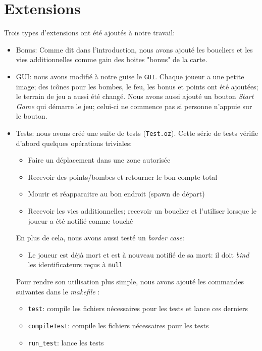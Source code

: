 \documentclass{article}
\begin{document}
\section{Extensions}
Trois types d'extensions ont été ajoutés à notre travail:
\begin{itemize}
	\item Bonus: Comme dit dans l'introduction, nous avons ajouté les boucliers et les vies additionnelles comme gain des boites "bonus" de la carte.
	\item GUI: nous avons modifié à notre guise le \texttt{GUI}. Chaque joueur a une petite image; des icônes pour les bombes, le feu, les bonus et points ont été ajoutées; le terrain de jeu a aussi été changé. Nous avons aussi ajouté un bouton \emph{Start Game} qui démarre le jeu; celui-ci ne commence pas si personne n'appuie sur le bouton. 
	\item Tests: nous avons créé une suite de tests (\texttt{Test.oz}). Cette série de tests vérifie d'abord quelques opérations triviales:
		\begin{itemize}
			\item Faire un déplacement dans une zone autorisée
			\item Recevoir des points/bombes et retourner le bon compte total
			\item Mourir et réapparaitre au bon endroit (spawn de départ)
			\item Recevoir les vies additionnelles; recevoir un bouclier et l'utiliser lorsque le joueur a été notifié comme touché
		\end{itemize}
	En plus de cela, nous avons aussi testé un \emph{border case}:
		\begin{itemize}
			\item Le joueur est déjà mort et est à nouveau notifié de sa mort: il doit \emph{bind} les identificateurs reçus à \texttt{null}
			
		\end{itemize}
	Pour rendre son utilisation plus simple, nous avons ajouté les commandes suivantes dans le \emph{makefile} :
	\begin{itemize}
		\item \texttt{test}: compile les fichiers nécessaires pour les tests et lance ces derniers
		\item \texttt{compileTest}: compile les fichiers nécessaires pour les tests
		\item \texttt{run\_test}: lance les tests
	\end{itemize}

\end{itemize}
\end{document}

